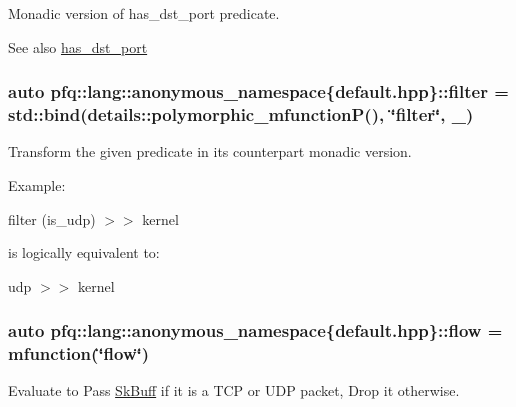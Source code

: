Monadic version of {\ttfamily has\+\_\+dst\+\_\+port} predicate. 

\begin{DoxySeeAlso}{See also}
\hyperlink{namespacepfq_1_1lang_1_1anonymous__namespace_02default_8hpp_03_afa71ece0f4178d0200c0388f503eef14}{has\+\_\+dst\+\_\+port} 
\end{DoxySeeAlso}
\hypertarget{namespacepfq_1_1lang_1_1anonymous__namespace_02default_8hpp_03_a2cd9558bea65b0eaf337f9e09ae2bdb3}{
\subsubsection[{filter}]{\setlength{\rightskip}{0pt plus 5cm}auto pfq\+::lang\+::anonymous\+\_\+namespace\{default.\+hpp\}\+::filter = std\+::bind(details\+::polymorphic\+\_\+mfunction\+P(), \char`\"{}filter\char`\"{}, \+\_)}}\label{namespacepfq_1_1lang_1_1anonymous__namespace_02default_8hpp_03_a2cd9558bea65b0eaf337f9e09ae2bdb3}


Transform the given predicate in its counterpart monadic version. 

Example\+:

filter (is\+\_\+udp) $>$$>$ kernel

is logically equivalent to\+:

udp $>$$>$ kernel \hypertarget{namespacepfq_1_1lang_1_1anonymous__namespace_02default_8hpp_03_af6c7518847c8c960b0e98cd856871a1b}{
\subsubsection[{flow}]{\setlength{\rightskip}{0pt plus 5cm}auto pfq\+::lang\+::anonymous\+\_\+namespace\{default.\+hpp\}\+::flow = {\bf mfunction}(\char`\"{}flow\char`\"{})}}\label{namespacepfq_1_1lang_1_1anonymous__namespace_02default_8hpp_03_af6c7518847c8c960b0e98cd856871a1b}


Evaluate to {\ttfamily Pass} \hyperlink{structpfq_1_1lang_1_1SkBuff}{Sk\+Buff} if it is a T\+C\+P or U\+D\+P packet, {\ttfamily Drop} it otherwise. 

